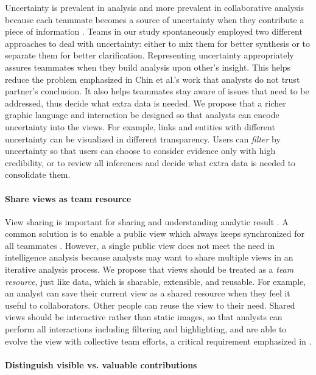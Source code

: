 Uncertainty is prevalent in analysis and more prevalent in collaborative
analysis because each teammate becomes a source of uncertainty when they
contribute a piece of information \cite{Chin2009}. Teams in our study
spontaneously employed two different approaches to deal with uncertainty: either
to mix them for better synthesis or to separate them for better clarification.
Representing uncertainty appropriately assures teammates when they build
analysis upon other's insight. This helps reduce the problem emphasized in Chin
et al.'s work \cite{Chin2009} that analysts do not trust partner's conclusion.
It also helps teammates stay aware of issues that need to be addressed, thus
decide what extra data is needed. We propose that a richer graphic language and
interaction be designed so that analysts can encode uncertainty into the views.
For example, links and entities with different uncertainty can be visualized in
different transparency. Users can \emph{filter} by uncertainty so that users can
choose to consider evidence only with high credibility, or to review all
inferences and decide what extra data is needed to consolidate them.

\paragraph{Share views as team resource}

View sharing is important for sharing and understanding analytic result
\cite{Morton2014a}. A common solution is to enable a public view which always
keeps synchronized for all teammates \cite{Convertino2011,Greenberg1990}.
However, a single public view does not meet the need in intelligence analysis
because analysts may want to share multiple views in an iterative analysis
process. We propose that views should be treated as a \emph{team resource}, just
like data, which is sharable, extensible, and reusable. For example, an analyst
can save their current view as a shared resource when they feel it useful to
collaborators. Other people can reuse the view to their need. Shared views
should be interactive rather than static images, so that analysts can perform
all interactions including filtering and highlighting, and are able to evolve
the view with collective team efforts, a critical requirement emphasized in
\cite{Carroll2013}.

\paragraph{Distinguish visible vs. valuable contributions}

